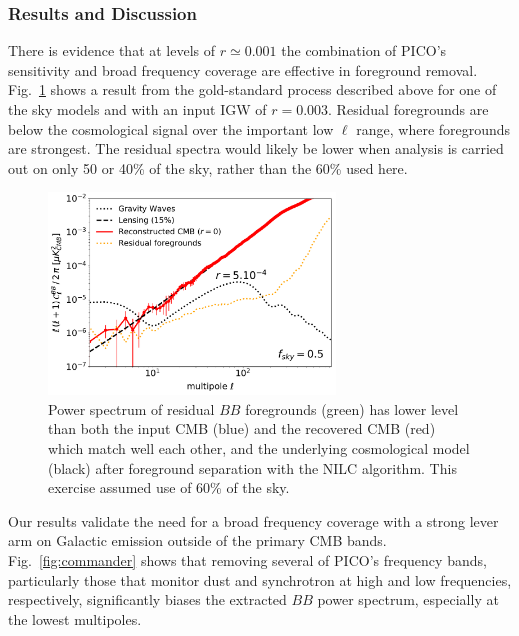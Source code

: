\documentclass[PICOReport.tex]{subfiles}
\begin{document}


\subsubsection{Results and Discussion}

There is evidence that at levels of $r \simeq 0.001$ the combination of PICO's sensitivity and broad frequency coverage are effective in foreground removal. Fig.~\ref{fig:nilc} shows a result from the gold-standard process described above for one of the sky models and with an input \ac{IGW} of $r=0.003$. Residual foregrounds are below the cosmological signal over the important low $\ell$ range, where foregrounds are strongest. The residual spectra would likely be lower when analysis is carried out on only 50 or 40\% of the sky, rather than the 60\% used here. 

\begin{figure}
\hspace{-0.1in}
\parbox{3.0in}{\centerline {
\includegraphics[width=3.0in]{images/gnilc_pico_90p92_r0_AL0p15_mc_test3_final.pdf}}}
\hspace{0.25in}
\parbox{3.0in}{
\caption{\captiontext
Power spectrum of residual $BB$ foregrounds (green) has lower level than both the input CMB (blue) and the recovered CMB (red) which match well each other, and the underlying cosmological model (black) after foreground separation with the NILC algorithm. This exercise assumed use of 60\% of the sky.   
\label{fig:nilc}}}
\vspace{-0.1in}
\end{figure}

Our results validate the need for a broad frequency coverage with a strong lever arm on Galactic emission outside of the primary CMB bands. Fig.~\ref{fig:commander} shows that removing several of PICO's frequency bands, particularly those that monitor dust and synchrotron at high and low frequencies, respectively, significantly biases the extracted $BB$ power spectrum, especially at the lowest multipoles. 
\end{document}
